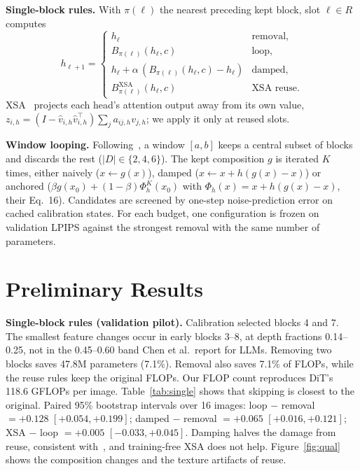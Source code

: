 \documentclass[sigconf,nonacm]{acmart}
\begin{document}
\textbf{Single-block rules.} With $\pi(\ell)$ the nearest preceding kept block, slot
$\ell\in R$ computes
\begin{equation}
h_{\ell+1}=\begin{cases}
h_\ell & \text{removal},\\
B_{\pi(\ell)}(h_\ell,c) & \text{loop},\\
h_\ell+\alpha\,(B_{\pi(\ell)}(h_\ell,c)-h_\ell) & \text{damped},\\
B^{\mathrm{XSA}}_{\pi(\ell)}(h_\ell,c) & \text{XSA reuse}.
\end{cases}
\end{equation}
XSA~\cite{chng2026loopeddit} projects each head's attention output away from its own
value, $z_{i,h}=(I-\hat v_{i,h}\hat v_{i,h}^\top)\sum_j a_{ij,h}v_{j,h}$; we apply it only
at reused slots.

\textbf{Window looping.} Following~\cite{chen2026looped}, a window $[a,b]$ keeps a
central subset of blocks and discards the rest ($|D|\in\{2,4,6\}$). The kept composition
$g$ is iterated $K$ times, either naively ($x\leftarrow g(x)$), damped
($x\leftarrow x+h(g(x)-x)$) or anchored
($\beta g(x_0)+(1-\beta)\Phi_h^K(x_0)$ with $\Phi_h(x)=x+h(g(x)-x)$, their Eq.~16).
Candidates are screened by one-step noise-prediction error on cached calibration states.
For each budget, one configuration is frozen on validation LPIPS against the strongest
removal with the same number of parameters.

\section{Preliminary Results}

\textbf{Single-block rules (validation pilot).} Calibration selected blocks 4 and 7.
The smallest feature changes occur in early blocks 3--8, at depth fractions 0.14--0.25,
not in the 0.45--0.60 band Chen et al.\ report for LLMs. Removing two blocks saves 47.8M
parameters (7.1\%). Removal also saves 7.1\% of FLOPs, while the reuse rules keep the
original FLOPs. Our FLOP count reproduces DiT's 118.6 GFLOPs per image.
Table~\ref{tab:single} shows that skipping is closest to the original. Paired 95\%
bootstrap intervals over 16 images: loop $-$ removal $=+0.128$ $[+0.054,+0.199]$; damped
$-$ removal $=+0.065$ $[+0.016,+0.121]$; XSA $-$ loop $=+0.005$ $[-0.033,+0.045]$. Damping
halves the damage from reuse, consistent with~\cite{chen2026looped}, and training-free XSA
does not help. Figure~\ref{fig:qual} shows the composition changes and the texture
artifacts of reuse.
\end{document}
